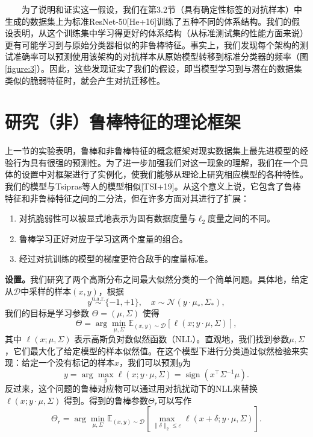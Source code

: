 \documentclass{article}
\begin{document}
\ \ \ \ 为了说明和证实这一假设，我们在第3.2节（具有确定性标签的对抗样本）中生成的数据集上为标准ResNet-50[He+16]训练了五种不同的体系结构。我们的假设表明，从这个训练集中学习得更好的体系结构（从标准测试集的性能方面来说）更有可能学习到与原始分类器相似的非鲁棒特征。事实上，我们发现每个架构的测试准确率可以预测使用该架构的对抗样本从原始模型转移到标准分类器的频率（图\ref{figure:3}）。因此，这些发现证实了我们的假设，即当模型学习到与潜在的数据集类似的脆弱特征时，就会产生对抗迁移性。

\section{研究（非）鲁棒特征的理论框架}

上一节的实验表明，鲁棒和非鲁棒特征的概念框架对现实数据集上最先进模型的经验行为具有很强的预测性。为了进一步加强我们对这一现象的理解，我们在一个具体的设置中对框架进行了实例化，使我们能够从理论上研究相应模型的各种特性。我们的模型与Tsipras等人的模型相似[TSI+19]。从这个意义上说，它包含了鲁棒特征和非鲁棒特征之间的二分法，但在许多方面对其进行了扩展：
\begin{enumerate}
  \item 对抗脆弱性可以被显式地表示为固有数据度量与$\ell_{2}$度量之间的不同。
  \item 鲁棒学习正好对应于学习这两个度量的组合。
  \item 经过对抗训练的模型的梯度更符合敌手的度量标准。
\end{enumerate}

\textbf{设置。}我们研究了两个高斯分布之间最大似然分类的一个简单问题。具体地，给定从$\mathcal{D}$中采样的样本$(x, y)$，根据
\begin{equation}
  y \stackrel{\mathrm{u.a.r.}}{\sim}\{-1,+1\}, \quad x \sim \mathcal{N}\left(y \cdot \mu_{*}, \Sigma_{*}\right),
\end{equation}
我们的目标是学习参数 $\Theta=(\mu, \Sigma)$ 使得
\begin{equation}
  \Theta=\arg \min _{\mu, \Sigma} \mathbb{E}_{(x, y) \sim \mathcal{D}}[\ell(x ; y \cdot \mu, \Sigma)],
\end{equation}
其中 $\ell(x ; \mu, \Sigma)$ 表示高斯负对数似然函数（NLL）。直观地，我们找到参数$\mu, \Sigma$，它们最大化了给定模型的样本似然值。在这个模型下进行分类通过似然检验来实现：给定一个没有标记的样本$x$，我们可以预测$y$为
\begin{equation}
  y=\arg \max _{y} \ell(x ; y \cdot \mu, \Sigma)=\operatorname{sign}\left(x^{\top} \Sigma^{-1} \mu\right).
\end{equation}
反过来，这个问题的鲁棒对应物可以通过用对抗扰动下的NLL来替换 $\ell(x ; y \cdot \mu, \Sigma)$ 得到。得到的鲁棒参数$\Theta_{r}$可以写作
\begin{equation}
  \Theta_{r}=\arg \min _{\mu, \Sigma} \mathbb{E}_{(x, y) \sim \mathcal{D}}\left[\max _{\|\delta\|_{2} \leq \varepsilon} \ell(x+\delta ; y \cdot \mu, \Sigma)\right].
\end{equation}
\end{document}

